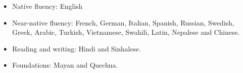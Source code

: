 \documentclass[%
    11pt,
  oneside
  ]{memoir}
\begin{document}
\begin{itemize}
\tightlist
\item
  Native fluency: English
\item
  Near-native fluency: French, German, Italian, Spanish, Russian,
  Swedish, Greek, Arabic, Turkish, Vietnamese, Swahili, Latin, Nepalese
  and Chinese.
\item
  Reading and writing: Hindi and Sinhalese.
\item
  Foundations: Mayan and Quechua.
\end{itemize}
\end{document}
